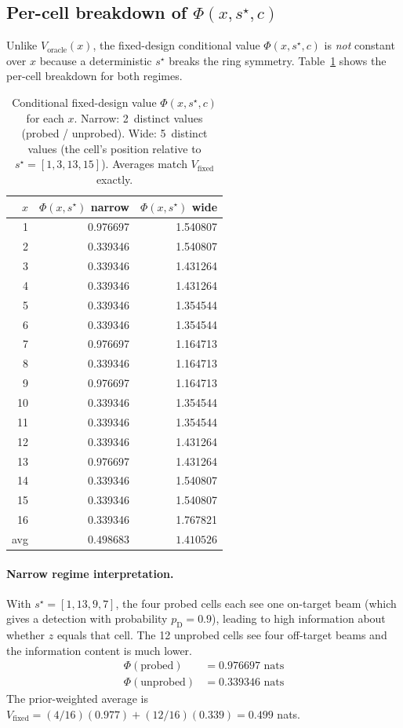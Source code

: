 \documentclass[11pt,a4paper]{article}
\begin{document}
\subsection{Per-cell breakdown of $\Phi(x, s^\star, c)$}

Unlike $V_{\text{oracle}}(x)$, the fixed-design conditional value $\Phi(x, s^\star, c)$ is \emph{not} constant over $x$ because a deterministic $s^\star$ breaks the ring symmetry.  Table~\ref{tab:Phi_per_x} shows the per-cell breakdown for both regimes.

\begin{table}[h!]
\centering
\begin{tabular}{@{}rrr@{}}
\toprule
$x$ & $\Phi(x, s^\star)$ narrow & $\Phi(x, s^\star)$ wide \\
\midrule
1   & 0.976697 & 1.540807 \\
2   & 0.339346 & 1.540807 \\
3   & 0.339346 & 1.431264 \\
4   & 0.339346 & 1.431264 \\
5   & 0.339346 & 1.354544 \\
6   & 0.339346 & 1.354544 \\
7   & 0.976697 & 1.164713 \\
8   & 0.339346 & 1.164713 \\
9   & 0.976697 & 1.164713 \\
10  & 0.339346 & 1.354544 \\
11  & 0.339346 & 1.354544 \\
12  & 0.339346 & 1.431264 \\
13  & 0.976697 & 1.431264 \\
14  & 0.339346 & 1.540807 \\
15  & 0.339346 & 1.540807 \\
16  & 0.339346 & 1.767821 \\
\midrule
avg & $0.498683$ & $1.410526$ \\
\bottomrule
\end{tabular}
\caption{Conditional fixed-design value $\Phi(x, s^\star, c)$ for each $x$.  Narrow: 2~distinct values (probed / unprobed).  Wide: 5~distinct values (the cell's position relative to $s^\star = [1, 3, 13, 15]$).  Averages match $V_{\text{fixed}}$ exactly.}
\label{tab:Phi_per_x}
\end{table}

\paragraph{Narrow regime interpretation.}  With $s^\star = [1, 13, 9, 7]$, the four probed cells each see one on-target beam (which gives a detection with probability $p_{\mathrm{D}} = 0.9$), leading to high information about whether $z$ equals that cell.  The 12 unprobed cells see four off-target beams and the information content is much lower.
\begin{align*}
  \Phi(\text{probed})   &= 0.976697 \text{ nats} \\
  \Phi(\text{unprobed}) &= 0.339346 \text{ nats}
\end{align*}
The prior-weighted average is $V_{\text{fixed}} = (4/16)(0.977) + (12/16)(0.339) = 0.499$ nats.
\end{document}
